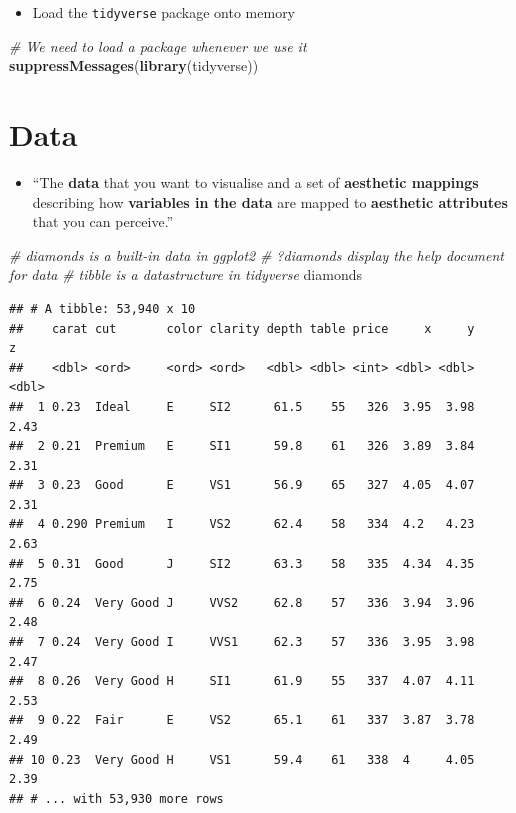 \documentclass[]{book}
\newenvironment{Shaded}{\begin{snugshade}}{\end{snugshade}}
\newcommand{\KeywordTok}[1]{\textcolor[rgb]{0.13,0.29,0.53}{\textbf{{#1}}}}
\newcommand{\CommentTok}[1]{\textcolor[rgb]{0.56,0.35,0.01}{\textit{{#1}}}}
\newcommand{\NormalTok}[1]{{#1}}
\providecommand{\tightlist}{%
  \setlength{\itemsep}{0pt}\setlength{\parskip}{0pt}}
\begin{document}
\begin{itemize}
\tightlist
\item
  Load the \texttt{tidyverse} package onto memory
\end{itemize}

\begin{Shaded}
\begin{Highlighting}[]
\CommentTok{# We need to load a package whenever we use it}
\KeywordTok{suppressMessages}\NormalTok{(}\KeywordTok{library}\NormalTok{(tidyverse)) }
\end{Highlighting}
\end{Shaded}

\section{Data}\label{data}

\begin{itemize}
\tightlist
\item
  ``The \textbf{data} that you want to visualise and a set of
  \textbf{aesthetic mappings} describing how \textbf{variables in the
  data} are mapped to \textbf{aesthetic attributes} that you can
  perceive.'' \citep{ggplot2}
\end{itemize}

\begin{Shaded}
\begin{Highlighting}[]
\CommentTok{# diamonds is a built-in data in ggplot2}
\CommentTok{# ?diamonds display the help document for data }
\CommentTok{# tibble is a datastructure in tidyverse }
\NormalTok{diamonds}
\end{Highlighting}
\end{Shaded}

\begin{verbatim}
## # A tibble: 53,940 x 10
##    carat cut       color clarity depth table price     x     y     z
##    <dbl> <ord>     <ord> <ord>   <dbl> <dbl> <int> <dbl> <dbl> <dbl>
##  1 0.23  Ideal     E     SI2      61.5    55   326  3.95  3.98  2.43
##  2 0.21  Premium   E     SI1      59.8    61   326  3.89  3.84  2.31
##  3 0.23  Good      E     VS1      56.9    65   327  4.05  4.07  2.31
##  4 0.290 Premium   I     VS2      62.4    58   334  4.2   4.23  2.63
##  5 0.31  Good      J     SI2      63.3    58   335  4.34  4.35  2.75
##  6 0.24  Very Good J     VVS2     62.8    57   336  3.94  3.96  2.48
##  7 0.24  Very Good I     VVS1     62.3    57   336  3.95  3.98  2.47
##  8 0.26  Very Good H     SI1      61.9    55   337  4.07  4.11  2.53
##  9 0.22  Fair      E     VS2      65.1    61   337  3.87  3.78  2.49
## 10 0.23  Very Good H     VS1      59.4    61   338  4     4.05  2.39
## # ... with 53,930 more rows
\end{verbatim}
\end{document}
